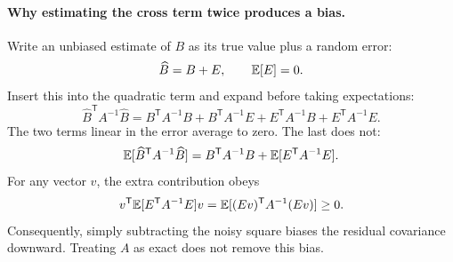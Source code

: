 \paragraph{Why estimating the cross term twice produces a bias.}
Write an unbiased estimate of $B$ as its true value plus a random error:
\begin{equation}
 \widehat B=B+E,\qquad \mathbb{E}[E]=0.
\end{equation}
Insert this into the quadratic term and expand before taking expectations:
\begin{equation}
 \widehat B^{\mathsf T}A^{-1}\widehat B
 =B^{\mathsf T}A^{-1}B+B^{\mathsf T}A^{-1}E
 +E^{\mathsf T}A^{-1}B+E^{\mathsf T}A^{-1}E.
\end{equation}
The two terms linear in the error average to zero. The last does not:
\begin{equation}
 \mathbb{E}[\widehat B^{\mathsf T}A^{-1}\widehat B]
 =B^{\mathsf T}A^{-1}B+\mathbb{E}[E^{\mathsf T}A^{-1}E].
\end{equation}
For any vector $v$, the extra contribution obeys
\begin{equation}
 v^{\mathsf T}\mathbb{E}[E^{\mathsf T}A^{-1}E]v
 =\mathbb{E}[(Ev)^{\mathsf T}A^{-1}(Ev)]\geq0.
\end{equation}
Consequently, simply subtracting the noisy square biases the residual
covariance downward. Treating $A$ as exact does not remove this bias.

